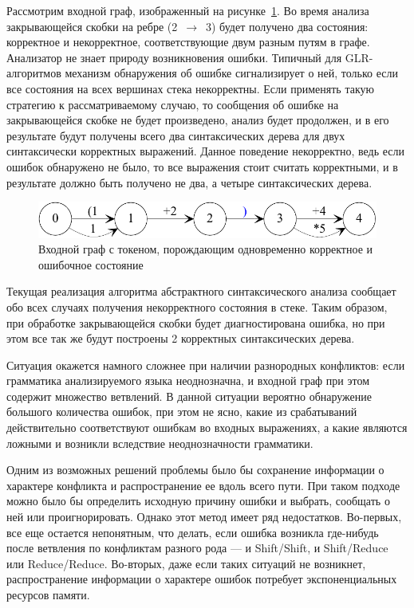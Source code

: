 Рассмотрим входной граф, изображенный на рисунке~\ref{both}. Во время анализа закрывающейся 
скобки на ребре (2~$\to$~3) будет получено два состояния: корректное и некорректное, 
соответствующие двум разным путям в графе. Анализатор не знает природу возникновения 
ошибки. Типичный для GLR-алгоритмов механизм обнаружения об ошибке сигнализирует 
о ней, только если все состояния на всех вершинах стека некорректны. Если применять 
такую стратегию к рассматриваемому случаю, то сообщения об ошибке на закрывающейся 
скобке не будет произведено, анализ будет продолжен, и в его результате будут 
получены всего два синтаксических дерева для двух синтаксически корректных выражений. 
Данное поведение некорректно, ведь если ошибок обнаружено не было, то все выражения 
стоит считать корректными, и в результате должно быть получено не два, а четыре 
синтаксических дерева.

\begin{figure}[h]
 \label{both}
 \centering
 \includegraphics[width=0.75\linewidth]{Verbitskaia/BothStates.pdf}
 \caption{Входной граф с токеном, порождающим одновременно корректное и ошибочное состояние}
 \label{both}
\end{figure}

Текущая реализация алгоритма абстрактного синтаксического анализа сообщает обо 
всех случаях получения некорректного состояния в стеке. Таким образом, при обработке 
закрывающейся скобки будет диагностирована ошибка, но при этом все так же будут 
построены 2 корректных синтаксических дерева. 

Ситуация окажется намного сложнее при наличии разнородных конфликтов: если грамматика 
анализируемого языка неоднозначна, и входной граф при этом содержит множество 
ветвлений. В данной ситуации вероятно обнаружение большого количества ошибок, при 
этом не ясно, какие из срабатываний действительно соответствуют ошибкам во входных 
выражениях, а какие являются ложными и возникли вследствие неоднозначности грамматики. 

Одним из возможных решений проблемы было бы сохранение информации о характере 
конфликта и распространение ее вдоль всего пути. При таком подходе можно было бы 
определить исходную причину ошибки и выбрать, сообщать о ней или проигнорировать. 
Однако этот метод имеет ряд недостатков. Во-первых, все еще остается непонятным, 
что делать, если ошибка возникла где-нибудь после ветвления по конфликтам разного 
рода — и Shift/Shift, и Shift/Reduce или Reduce/Reduce. Во-вторых, даже если таких 
ситуаций не возникнет, распространение информации о характере ошибок потребует 
экспоненциальных ресурсов памяти. 

